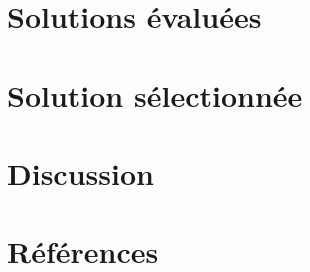 \documentclass[11pt,a4paper]{article}
\begin{document}
\section{Solutions évaluées}




\section{Solution sélectionnée}



\section{Discussion}


\section{Références}

\end{document}
